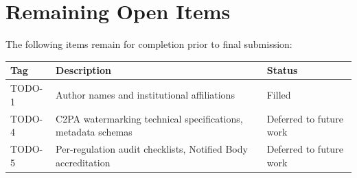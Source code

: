 \documentclass[11pt,a4paper]{article}
\begin{document}
\appendix

\section{Remaining Open Items}
\label{app:todos}

The following items remain for completion prior to final submission:

\begin{longtable}{@{}lp{10cm}l@{}}
\toprule
Tag & Description & Status \\
\midrule
TODO-1 & Author names and institutional affiliations & Filled \\
TODO-4 & C2PA watermarking technical specifications, metadata schemas & Deferred to future work \\
TODO-5 & Per-regulation audit checklists, Notified Body accreditation & Deferred to future work \\
\bottomrule
\end{longtable}
\end{document}
